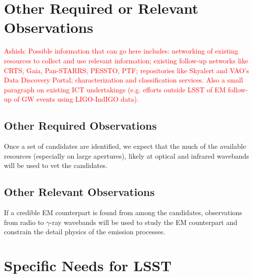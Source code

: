 \documentclass [11pt]{article}
\begin{document}
\section{Other Required or Relevant Observations}

\textcolor{red}{Ashish: Possible information that can go here includes:
networking of existing resources to collect and use relevant information; 
existing follow-up networks like CRTS, Gaia, Pan-STARRS, PESSTO, PTF; 
repositories like Skyalert and VAO's Data Discovery Portal; 
characterization and classification services.
Also a small paragraph on existing ICT undertakings (e.g. efforts outside LSST of EM follow-up of GW events using LIGO-IndIGO data).}


\subsection{Other Required Observations}

%
Once a set of candidates are identified, we expect that the much of the available resources (especially on large apertures), likely at optical and infrared wavebands will be used to vet the candidates.


\subsection{Other Relevant Observations}

If a credible EM counterpart is found from among the candidates, observations from radio to $\gamma$-ray wavebands will be used to study the EM counterpart and constrain the detail physics of the emission processes.


\section{Specific Needs for LSST}
\end{document}
